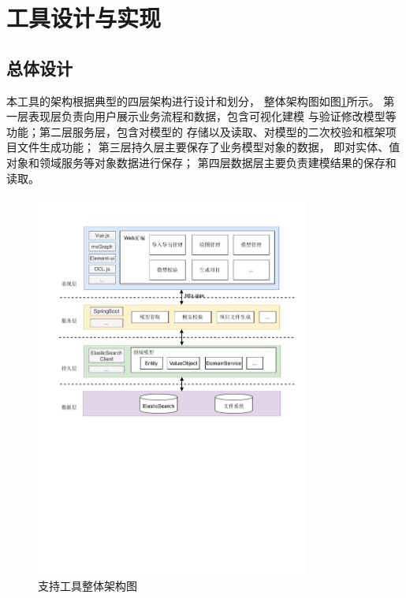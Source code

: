 \section{工具设计与实现}
\subsection{总体设计}



本工具的架构根据典型的四层架构\cite{王君2007基于}进行设计和划分，
整体架构图如图\ref{overallarchitecture}所示。
第一层表现层负责向用户展示业务流程和数据，包含可视化建模
与验证修改模型等功能；第二层服务层，包含对模型的
存储以及读取、对模型的二次校验和框架项目文件生成功能；
第三层持久层主要保存了业务模型对象的数据，
即对实体、值对象和领域服务等对象数据进行保存；
第四层数据层主要负责建模结果的保存和读取。

\begin{figure}[!htbp] %
    \centering %
    \includegraphics[width=0.8\textwidth]{FIGs/chapter4/overallarchitecture.pdf} %
    \caption{支持工具整体架构图} %
    \label{overallarchitecture} %
\end{figure}%


